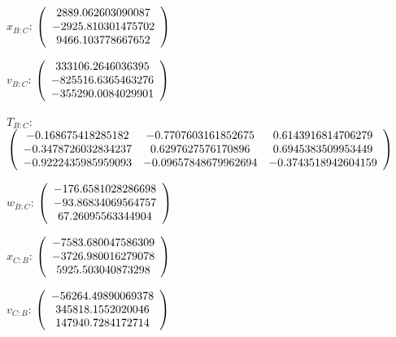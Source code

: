 \begin{description}
$x_{B:C}$: $\left( \begin{array} {ccc} 2889.062603090087 \\    -2925.810301475702 \\     9466.103778667652
\end{array} \right)\\ \\$

$v_{B:C}$:  $\left( \begin{array} {ccc}  333106.2646036395 \\    -825516.6365463276 \\    -355290.0084029901
\end{array} \right)\\ \\$

$T_{B:C}$: $\left( \begin{array} {ccc}
 -0.168675418285182 &   -0.7707603161852675 &    0.6143916814706279 \\
 -0.3478726032834237 &    0.6297627576170896 &    0.6945383509953449 \\
 -0.9222435985959093 &  -0.09657848679962694 &   -0.3743518942604159 \\
\end{array} \right)\\ \\$

$w_{B:C}$:  $\left( \begin{array} {ccc}  -176.6581028286698 \\    -93.86834069564757 \\     67.26095563344904
\end{array} \right)\\ \\$

$x_{C:B}$: $\left( \begin{array} {ccc}  -7583.680047586309 \\    -3726.980016279078 \\     5925.503040873298
\end{array} \right)\\ \\$

$v_{C:B}$:  $\left( \begin{array} {ccc}  -56264.49890069378 \\     345818.1552020046 \\     147940.7284172714
\end{array} \right)\\ \\$


\end{description}
